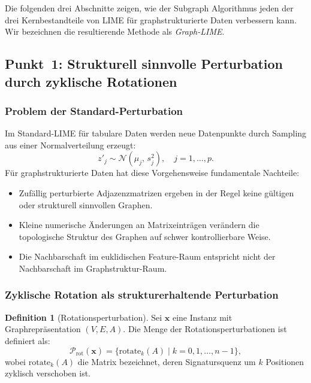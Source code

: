 ﻿\documentclass[a4paper,12pt]{article}
\theoremstyle{definition}
\newtheorem{definition}{Definition}[section]
\begin{document}
Die folgenden drei Abschnitte zeigen, wie der Subgraph Algorithmus jeden der drei
Kernbestandteile von LIME für graphstrukturierte Daten verbessern kann.
Wir bezeichnen die resultierende Methode als \emph{Graph-LIME}.

\subsection{Punkt~1: Strukturell sinnvolle Perturbation durch zyklische Rotationen}

\subsubsection{Problem der Standard-Perturbation}

Im Standard-LIME für tabulare Daten werden neue Datenpunkte durch Sampling aus einer
Normalverteilung erzeugt:
\[
  z'_j \sim \mathcal{N}(\mu_j,\, s_j^2), \quad j = 1, \ldots, p.
\]
Für graphstrukturierte Daten hat diese Vorgehensweise fundamentale Nachteile:
\begin{itemize}
  \item Zufällig perturbierte Adjazenzmatrizen ergeben in der Regel keine
        gültigen oder strukturell sinnvollen Graphen.
  \item Kleine numerische Änderungen an Matrixeinträgen verändern die topologische
        Struktur des Graphen auf schwer kontrollierbare Weise.
  \item Die Nachbarschaft im euklidischen Feature-Raum entspricht nicht der
        Nachbarschaft im Graphstruktur-Raum.
\end{itemize}

\subsubsection{Zyklische Rotation als strukturerhaltende Perturbation}

\begin{definition}[Rotationsperturbation]
  Sei $\mathbf{x}$ eine Instanz mit Graphrepräsentation $(V, E, A)$.
  Die Menge der Rotationsperturbationen ist definiert als:
  \[
    \mathcal{P}_{\mathrm{rot}}(\mathbf{x})
    = \bigl\{\mathrm{rotate}_k(A) \;\big|\; k = 0, 1, \ldots, n-1\bigr\},
  \]
  wobei $\mathrm{rotate}_k(A)$ die Matrix bezeichnet, deren Signatursquenz um $k$
  Positionen zyklisch verschoben ist.
\end{definition}
\end{document}
